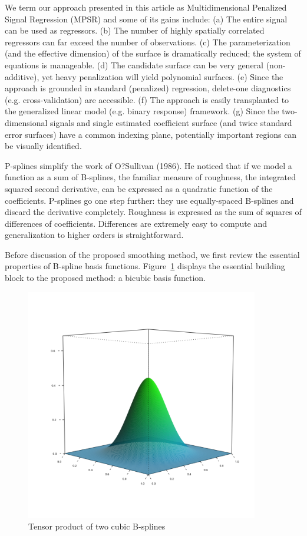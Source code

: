 \documentclass[12pt]{article}
\begin{document}
{We term our approach presented in this article as Multidimensional Penalized Signal Regression (MPSR) and some of its gains include: (a) The entire signal can be used as regressors. (b) The number of highly spatially correlated regressors can far exceed the number of observations. (c) The parameterization (and the effective dimension) of the surface is dramatically reduced; the system of equations is manageable. (d) The candidate surface can be very general (non-additive), yet heavy penalization will yield polynomial surfaces. (e) Since the approach is grounded in standard (penalized) regression, delete-one diagnostics (e.g. cross-validation) are accessible. (f) The approach is easily transplanted to the generalized linear model (e.g. binary response) framework. (g) Since the two-dimensional signals and single estimated coefficient surface (and twice standard error surfaces) have a common indexing plane, potentially important regions can be visually identified.}

P-splines simplify the work of O?Sullivan (1986). He noticed that if we model a
function as a sum of B-splines, the familiar measure of roughness, the integrated squared
second derivative, can be expressed as a quadratic function of the coefficients. P-splines
go one step further: they use equally-spaced B-splines and discard the derivative completely.
Roughness is expressed as the sum of squares of differences of coefficients. Differences
are extremely easy to compute and generalization to higher orders is straightforward.

Before discussion of the proposed smoothing method, we first review the essential properties of B-spline basis functions. Figure~\ref{fig:bicubic_bspline} displays the essential building block to the proposed method: a bicubic basis function. 
\begin{figure}[H]
  \centering
 \graphicspath{{img/}}
  \includegraphics[width=4in, height=4in]{bicubic_bspline.png}
  \caption{Tensor product of two cubic B-splines}\label{fig:bicubic_bspline}
\end{figure}
\end{document}
